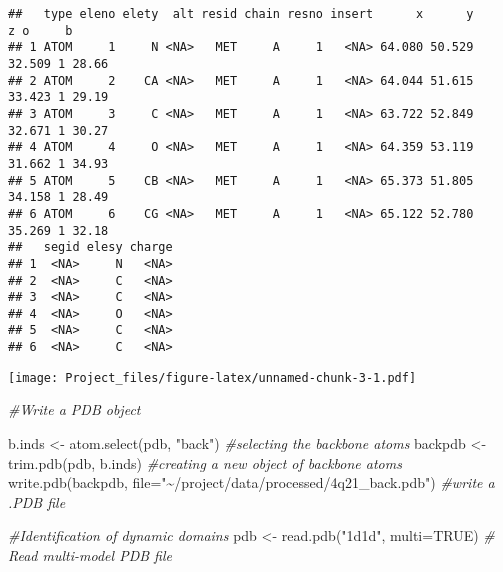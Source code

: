 \documentclass[
]{article}
\newenvironment{Shaded}{\begin{snugshade}}{\end{snugshade}}
\newcommand{\AttributeTok}[1]{\textcolor[rgb]{0.77,0.63,0.00}{#1}}
\newcommand{\CommentTok}[1]{\textcolor[rgb]{0.56,0.35,0.01}{\textit{#1}}}
\newcommand{\ConstantTok}[1]{\textcolor[rgb]{0.00,0.00,0.00}{#1}}
\newcommand{\FunctionTok}[1]{\textcolor[rgb]{0.00,0.00,0.00}{#1}}
\newcommand{\NormalTok}[1]{#1}
\newcommand{\OtherTok}[1]{\textcolor[rgb]{0.56,0.35,0.01}{#1}}
\newcommand{\SpecialCharTok}[1]{\textcolor[rgb]{0.00,0.00,0.00}{#1}}
\newcommand{\StringTok}[1]{\textcolor[rgb]{0.31,0.60,0.02}{#1}}
\begin{document}
\begin{verbatim}
##   type eleno elety  alt resid chain resno insert      x      y      z o     b
## 1 ATOM     1     N <NA>   MET     A     1   <NA> 64.080 50.529 32.509 1 28.66
## 2 ATOM     2    CA <NA>   MET     A     1   <NA> 64.044 51.615 33.423 1 29.19
## 3 ATOM     3     C <NA>   MET     A     1   <NA> 63.722 52.849 32.671 1 30.27
## 4 ATOM     4     O <NA>   MET     A     1   <NA> 64.359 53.119 31.662 1 34.93
## 5 ATOM     5    CB <NA>   MET     A     1   <NA> 65.373 51.805 34.158 1 28.49
## 6 ATOM     6    CG <NA>   MET     A     1   <NA> 65.122 52.780 35.269 1 32.18
##   segid elesy charge
## 1  <NA>     N   <NA>
## 2  <NA>     C   <NA>
## 3  <NA>     C   <NA>
## 4  <NA>     O   <NA>
## 5  <NA>     C   <NA>
## 6  <NA>     C   <NA>
\end{verbatim}

\begin{Shaded}
\end{Shaded}

\texttt{[image: Project\_files/figure-latex/unnamed-chunk-3-1.pdf]}

\begin{Shaded}
\begin{Highlighting}[]
\CommentTok{\#Write a PDB object}

\NormalTok{b.inds }\OtherTok{\textless{}{-}} \FunctionTok{atom.select}\NormalTok{(pdb, }\StringTok{"back"}\NormalTok{) }\CommentTok{\#selecting the backbone atoms}
\NormalTok{backpdb }\OtherTok{\textless{}{-}} \FunctionTok{trim.pdb}\NormalTok{(pdb, b.inds) }\CommentTok{\#creating a new object of backbone atoms}
\FunctionTok{write.pdb}\NormalTok{(backpdb, }\AttributeTok{file=}\StringTok{"\textasciitilde{}/project/data/processed/4q21\_back.pdb"}\NormalTok{) }\CommentTok{\#write a .PDB file}

\CommentTok{\#Identification of dynamic domains }
\NormalTok{pdb }\OtherTok{\textless{}{-}} \FunctionTok{read.pdb}\NormalTok{(}\StringTok{"1d1d"}\NormalTok{, }\AttributeTok{multi=}\ConstantTok{TRUE}\NormalTok{) }\CommentTok{\# Read multi{-}model PDB file}
\end{Highlighting}
\end{Shaded}
\end{document}
